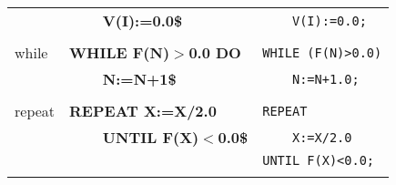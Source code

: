\begin{figure}
\begin{center}
\begin{tabular}{||l|l|l||}
&{\bf \ \ \ \ V(I):=0.0\$} &\verb!    V(I):=0.0;!\\
& & \\
    while      &{\bf WHILE F(N)$>$0.0 DO} &\verb!WHILE (F(N)>0.0)!\\
&{\bf \ \ \ \ N:=N+1\$} &\verb!    N:=N+1.0;!\\
& & \\
   repeat     &{\bf REPEAT X:=X/2.0} &\verb!REPEAT!\\
&{\bf \ \ \ \ UNTIL F(X)$<$0.0\$} &\verb!    X:=X/2.0!\\
& &\verb!UNTIL F(X)<0.0;!\\
& & \\\hline\hline
\end{tabular}
\end{center}
\end{figure}

